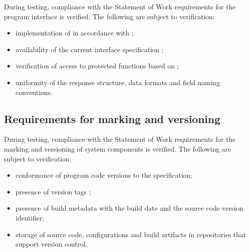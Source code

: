 \documentclass[12pt,a4paper]{extarticle}
\begin{document}
\begin{hseExample}
During testing, compliance with the Statement of Work requirements for the program interface is verified. The following are subject to verification:

\begin{itemize}[leftmargin=1.25cm]
    \item implementation of  in accordance with ;
    \item availability of the current interface specification ;
    \item verification of access to protected functions based on ;
    \item uniformity of the response structure, data formats and field naming conventions.
\end{itemize}
\end{hseExample}

\subsection{Requirements for marking and versioning}

\begin{hseExample}
During testing, compliance with the Statement of Work requirements for the marking and versioning of system components is verified. The following are subject to verification:

\begin{itemize}[leftmargin=1.25cm]
    \item conformance of program code versions to the  specification;
    \item presence of version tags ;
    \item presence of build metadata with the build date and the source code version identifier;
    \item storage of source code, configurations and build artifacts in repositories that support version control.
\end{itemize}
\end{hseExample}

\clearpage
\end{document}

